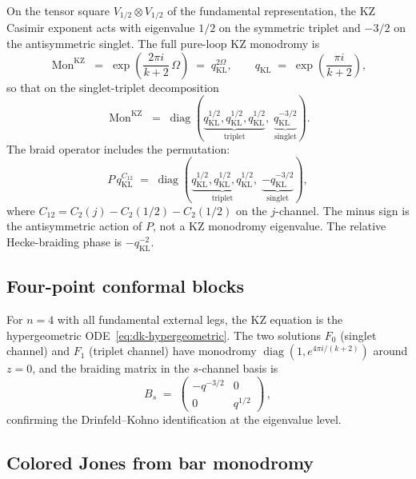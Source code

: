 \documentclass[11pt,reqno]{amsart}
\theoremstyle{definition}
\theoremstyle{remark}
\DeclareMathOperator{\Mon}{Mon}
\numberwithin{equation}{section}
\begin{document}
On the tensor square $V_{1/2} \otimes V_{1/2}$ of the
fundamental representation, the KZ Casimir exponent acts with
eigenvalue \(1/2\) on the symmetric triplet and \(-3/2\) on the
antisymmetric singlet.  The full pure-loop KZ monodromy is
\begin{equation}\label{eq:dk-sl2-r}
\Mon^{\mathrm{KZ}}
\;=\;
\exp\!\left(\frac{2\pi i}{k+2}\,\Omega\right)
\;=\;
q_{\mathrm{KL}}^{2\Omega},
\qquad
q_{\mathrm{KL}} \;=\; \exp\!\left(\frac{\pi i}{k+2}\right),
\end{equation}
so that on the singlet-triplet decomposition
\begin{equation}\label{eq:dk-sl2-r-matrix}
\Mon^{\mathrm{KZ}}
\;=\;
\operatorname{diag}(
\underbrace{q_{\mathrm{KL}}^{1/2}, q_{\mathrm{KL}}^{1/2},
q_{\mathrm{KL}}^{1/2}}_{\text{triplet}},\;
\underbrace{q_{\mathrm{KL}}^{-3/2}}_{\text{singlet}}
).
\end{equation}
The braid operator includes the permutation:
\begin{equation}\label{eq:dk-sl2-eigenvalues}
P\,q_{\mathrm{KL}}^{C_{12}}
\;=\;
\operatorname{diag}(
\underbrace{q_{\mathrm{KL}}^{1/2},q_{\mathrm{KL}}^{1/2},
q_{\mathrm{KL}}^{1/2}}_{\text{triplet}},\;
\underbrace{-q_{\mathrm{KL}}^{-3/2}}_{\text{singlet}}
),
\end{equation}
where \(C_{12}=C_2(j)-C_2(1/2)-C_2(1/2)\) on the \(j\)-channel.
The minus sign is the antisymmetric action of \(P\), not a KZ
monodromy eigenvalue.  The relative Hecke-braiding phase is
\(-q_{\mathrm{KL}}^{-2}\).

\subsection{Four-point conformal blocks}

For $n = 4$ with all fundamental external legs, the KZ
equation is the hypergeometric
ODE~\eqref{eq:dk-hypergeometric}.  The two solutions
$F_0$ (singlet channel) and $F_1$ (triplet channel) have
monodromy
$\operatorname{diag}(1, e^{4\pi i/(k+2)})$ around
$z = 0$, and the braiding matrix in the $s$-channel basis
is
\[
B_s
\;=\;
\begin{pmatrix}
-q^{-3/2} & 0 \\
0 & q^{1/2}
\end{pmatrix}\,,
\]
confirming the Drinfeld--Kohno identification at the
eigenvalue level.

\subsection{Colored Jones from bar monodromy}
\end{document}
